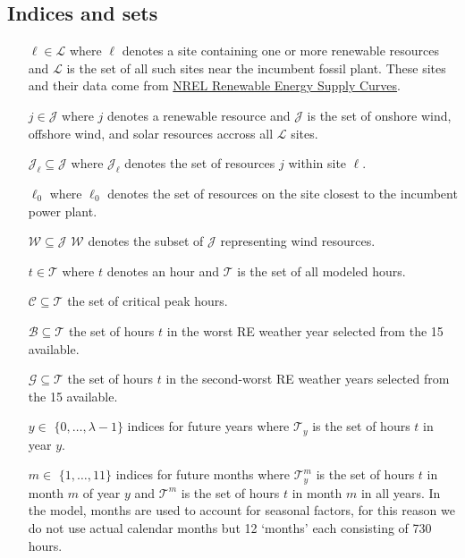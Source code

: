\documentclass[9pt, oneside]{article}
\numberwithin{equation}{subsubsection}
\begin{document}
\subsection{Indices and sets}\label{subsec:indices-and-sets}
\begin{multicols}{2}
	{\small
		\begin{itemize}
			\item[$\ell \in \mathcal{L}$] where $\ell$ denotes a site containing one or more renewable resources and $\mathcal{L}$ is the set of all such sites near the incumbent fossil plant.
			      These sites and their data come from \href{https://www.nrel.gov/gis/renewable-energy-supply-curves.html}{NREL Renewable Energy Supply Curves}.
			\item[$j \in \mathcal{J}$] where $j$ denotes a renewable resource and $\mathcal{J}$ is the set of onshore wind, offshore wind, and solar resources accross all $\mathcal{L}$ sites.
			\item[$\mathcal{J}_{\ell} \subseteq \mathcal{J}$] where $\mathcal{J}_{\ell}$ denotes the set of resources $j$ within site $\ell$.
			\item[$\ell_0$] where $\ell_0$ denotes the set of resources on the site closest to the incumbent power plant.
			\item[$\mathcal{W} \subseteq \mathcal{J}$] $\mathcal{W}$ denotes the subset of $\mathcal{J}$ representing wind resources.
			\item[$t \in \mathcal{T}$] where $t$ denotes an hour and $\mathcal{T}$ is the set of all modeled hours.
			\item[$\mathcal{C} \subseteq \mathcal{T}$] the set of critical peak hours.
			\item[$\mathcal{B} \subseteq \mathcal{T}$] the set of hours $t$ in the worst RE weather year selected from the 15 available.
			\item[$\mathcal{G} \subseteq \mathcal{T}$] the set of hours $t$ in the second-worst RE weather years selected from the 15 available.
			\item[$y \in$] $\{0,\dots,\lambda-1\}$ indices for future years where $\mathcal{T}_y$ is the set of hours $t$ in year $y$.
			\item[$m \in$] $\{1,\dots,11\}$ indices for future months where $\mathcal{T}_y^m$ is the set of hours $t$ in month $m$ of year $y$ and $\mathcal{T}^m$ is the set of hours $t$ in month $m$ in all years.
			      In the model, months are used to account for seasonal factors, for this reason we do not use actual calendar months but 12 `months' each consisting of 730 hours.
		\end{itemize}
	}
\end{multicols}
\end{document}
